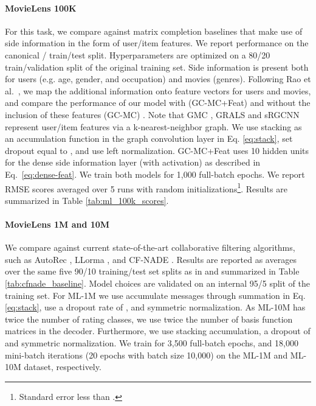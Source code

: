 \documentclass[twoside]{article}
\begin{document}
\paragraph{MovieLens 100K}
For this task, we compare against matrix completion baselines that make use of side information in the form of user/item features. We report performance on the canonical / train/test split. Hyperparameters are optimized on a 80/20 train/validation split of the original training set. Side information is present both for users (e.g. age, gender, and occupation) and movies (genres). Following Rao et al.~\cite{GralsRaoNIPS2015}, we map the additional information onto feature vectors for users and movies, and compare the performance of our model with (GC-MC+Feat) and without the inclusion of these features (GC-MC) . Note that GMC \cite{kalofolias2014matrix}, GRALS \cite{GralsRaoNIPS2015} and sRGCNN \cite{2017_Monti_arXiv} represent user/item features via a k-nearest-neighbor graph. We use stacking as an accumulation function in the graph convolution layer in Eq. \eqref{eq:stack}, set dropout equal to , and use left normalization. GC-MC+Feat uses 10 hidden units for the dense side information layer (with  activation) as described in Eq.~\ref{eq:dense-feat}. We train both models for 1,000 full-batch epochs. We report RMSE scores averaged over 5 runs with random initializations\footnote{Standard error less than .}. Results are summarized in Table \ref{tab:ml_100k_scores}.
\paragraph{MovieLens 1M and 10M}
We compare against current state-of-the-art collaborative filtering algorithms, such as AutoRec \cite{sedhain2015autorec}, LLorma \cite{lee2013local}, and CF-NADE \cite{zheng2016neural}. Results are reported as averages over the same five 90/10 training/test set splits as in \cite{zheng2016neural} and summarized in Table \ref{tab:cfnade_baseline}. Model choices are validated on an internal 95/5 split of the training set. For ML-1M we use accumulate messages through summation in Eq.  \eqref{eq:stack}, use a dropout rate of , and symmetric normalization. 
As ML-10M has twice the number of rating classes, we use twice the number of basis function matrices in the decoder. Furthermore, we use stacking accumulation, a dropout of  and symmetric normalization.
We train for 3,500 full-batch epochs, and 18,000 mini-batch iterations (20 epochs with batch size 10,000) on the ML-1M and ML-10M dataset, respectively.  
\end{document}
